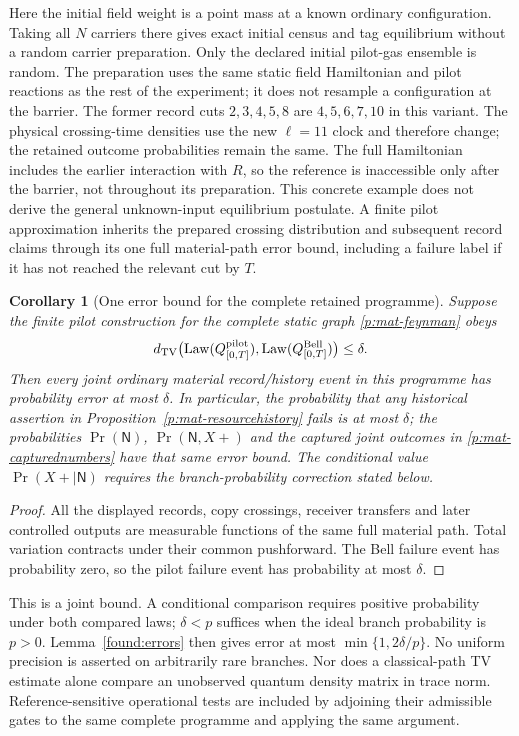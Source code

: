\documentclass[11pt,oneside,openany]{book}
\newtheorem{corollary}[theorem]{Corollary}
\theoremstyle{definition}
\theoremstyle{remark}\newtheorem{remark}[theorem]{Remark}
\providecommand{\TV}{d_{\mathrm{TV}}}
\providecommand{\pLaw}{\operatorname{Law}}
\begin{document}
Here the initial field weight is a point mass at a known ordinary
configuration.  Taking all $N$ carriers there gives exact initial
census and tag equilibrium without a random carrier preparation.
Only the declared initial pilot-gas ensemble is random.  The preparation
uses the same static field Hamiltonian and pilot reactions as the rest
of the experiment; it does not resample a configuration at the barrier.
The former record cuts $2,3,4,5,8$ are $4,5,6,7,10$ in this variant.
The physical crossing-time densities use the new $\ell=11$ clock and
therefore change; the retained outcome probabilities remain the same.
The full Hamiltonian includes the earlier interaction with $R$, so the
reference is inaccessible only after the barrier, not throughout its
preparation.  This concrete example does not derive the general
unknown-input equilibrium postulate.  A finite pilot approximation
inherits the prepared crossing distribution and subsequent record
claims through its one full material-path error bound, including a
failure label if it has not reached the relevant cut by $T$.

\begin{corollary}[One error bound for the complete retained programme]
\label{p:programme}
Suppose the finite pilot construction for the complete static graph
\eqref{p:mat-feynman} obeys
\[
 \TV\bigl(\pLaw(Q^{\rm pilot}_{[0,T]}),
            \pLaw(Q^{\rm Bell}_{[0,T]})\bigr)\le\delta.
\]
Then every joint ordinary material record/history event in this
programme has probability error at most $\delta$.  In particular,
the probability that any historical assertion in
Proposition~\ref{p:mat-resourcehistory} fails is at most $\delta$;
the probabilities $\Pr(\mathsf N)$, $\Pr(\mathsf N,X+)$ and the captured joint outcomes
in \eqref{p:mat-capturednumbers} have that same error bound.  The
conditional value $\Pr(X+\mid\mathsf N)$ requires the branch-probability
correction stated below.
\end{corollary}
\begin{proof}
All the displayed records, copy crossings, receiver transfers and
later controlled outputs are measurable functions of the same full
material path.  Total variation contracts under their common
pushforward.  The Bell failure event has probability zero, so the
pilot failure event has probability at most $\delta$.
\end{proof}
This is a joint bound. A conditional comparison requires positive
probability under both compared laws; $\delta<p$ suffices when the
ideal branch probability is $p>0$. Lemma~\ref{found:errors} then gives
error at most $\min\{1,2\delta/p\}$. No uniform precision is asserted
on arbitrarily rare branches.  Nor does a classical-path TV estimate alone compare an
unobserved quantum density matrix in trace norm.  Reference-sensitive
operational tests are included by adjoining their admissible gates
to the same complete programme and applying the same argument.
\end{document}
